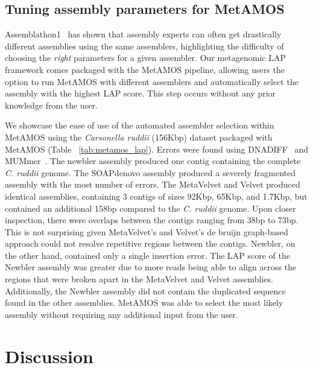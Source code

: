 \renewcommand{\baselinestretch}{2}
\small\normalsize

\subsection{Tuning assembly parameters for MetAMOS}
Assemblathon1~\cite{earl2011assemblathon} has shown that assembly experts can often get drastically different assemblies using the same assemblers, highlighting the difficulty of choosing the \emph{right} parameters for a given assembler.
Our metagenomic LAP framework comes packaged with the MetAMOS pipeline, allowing users the option to run MetAMOS with different assemblers and automatically select the assembly with the highest LAP score.
This step occurs without any prior knowledge from the user.

We showcase the ease of use of the automated assembler selection within MetAMOS using the \emph{Carsonella ruddii} (156Kbp) dataset packaged with MetAMOS (Table ~\ref{tab:metamos_lap}).
Errors were found using DNADIFF~\cite{phillippy2008genome} and MUMmer~\cite{delcher2003using}.
The newbler assembly produced one contig containing the complete \emph{C. ruddii} genome.
The SOAPdenovo assembly produced a severely fragmented assembly with the most number of errors.
The MetaVelvet and Velvet produced identical assemblies, containing 3 contigs of sizes 92Kbp, 65Kbp, and 1.7Kbp, but contained an additional 158bp compared to the \emph{C. ruddii} genome.
Upon closer inspection, there were overlaps between the contigs ranging from 38bp to 73bp.
This is not surprising given MetaVelvet's and Velvet's de bruijn graph-based approach could not resolve repetitive regions between the contigs.
Newbler, on the other hand, contained only a single insertion error.
The LAP score of the Newbler assembly was greater due to more reads being able to align across the regions that were broken apart in the MetaVelvet and Velvet assemblies.
Additionally, the Newbler assembly did not contain the duplicated sequence found in the other assemblies.
MetAMOS was able to select the most likely assembly without requiring any additional input from the user.

\section{Discussion}

